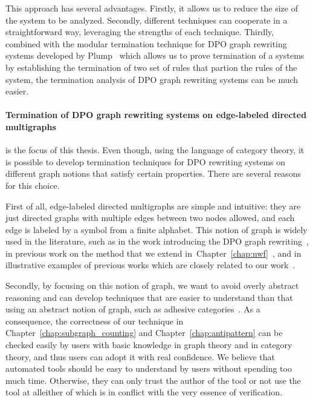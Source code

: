   This approach has several advantages.
  Firstly, it allows us to reduce the size of the system to be analyzed. Secondly, different techniques can cooperate in a straightforward way, leveraging the strengths of each technique. 
  Thirdly, combined with the modular termination technique for DPO graph rewriting systems developed by Plump~\cite{plump2018modular} which allows us to prove termination of a systems by establishing the termination of two set of rules that partion the rules of the system, the termination analysis of DPO graph rewriting systems can be much easier.

\paragraph{Termination of DPO graph rewriting systems on edge-labeled directed multigraphs} is the focus of this thesis.
Even though, using the language of category theory, it is possible to develop termination techniques for DPO rewriting systems on different graph notions that satisfy certain properties. There are several reasons for this choice.

First of all, edge-labeled directed multigraphs are simple and intuitive: they are just directed graphs with multiple edges between two nodes allowed, and each edge is labeled by a symbol from a finite alphabet. This notion of graph is widely used in the literature, such as in the work introducing the DPO graph rewriting~\cite{ehrig1973graph}, in previous work on the method that we extend in~Chapter~\ref{chap:nwf}~\cite{bruggink2014termination,bruggink2015proving,zantema2014termination}, and in illustrative examples of previous works which are closely related to our work~\cite{overbeek2024termination_lmcs,endrullis2024generalized_icgt}.

 Secondly, by focusing on this notion of graph, we want to avoid overly abstract reasoning and can develop techniques that are easier to understand than that using an abstract notion of graph, such as adhesive categories~\cite{lack2004adhesive}.
 As a consequence, the correctness of our technique in Chapter~\ref{chap:subgraph_counting} and Chapter~\ref{chap:antipattern} can be checked easily by users with basic knowledge in graph theory and in category theory, and thus users can adopt it with real confidence.
 We believe that automated tools should be easy
to understand by users without
spending too much time. Otherwise, they can only trust the author of the tool
or not use the tool at all\textemdash either of which is in conflict with the very essence of verification.  

